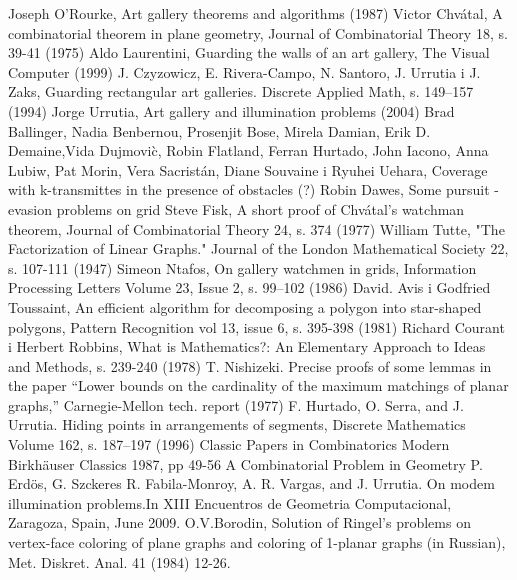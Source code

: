 \documentclass[brudnopis]{xmgr}
\theoremstyle{definition}
\begin{document}
\begin{bibdiv}
\begin{biblist}
  Joseph O'Rourke, Art gallery theorems and algorithms (1987)
  Victor Chv\'atal, A combinatorial theorem in plane geometry, Journal of Combinatorial Theory 18, s. 39-41 (1975)
  Aldo Laurentini, Guarding the walls of an art gallery, The Visual Computer (1999)
  J. Czyzowicz, E. Rivera-Campo, N. Santoro, J. Urrutia i J. Zaks, Guarding rectangular art galleries. Discrete Applied Math, s. 149–157 (1994)
  Jorge Urrutia, Art gallery and illumination problems (2004)
  Brad Ballinger, Nadia Benbernou, Prosenjit Bose, Mirela Damian, Erik D. Demaine,Vida Dujmovi\`c, Robin Flatland, Ferran Hurtado, John Iacono, Anna Lubiw, Pat Morin, Vera Sacristán, Diane Souvaine i Ryuhei Uehara, Coverage with k-transmittes in the presence of obstacles (?)
  Robin Dawes, Some pursuit - evasion problems on grid
  Steve Fisk, A short proof of Chv\'atal's watchman theorem, Journal of Combinatorial Theory 24, s. 374 (1977)
  William Tutte, "The Factorization of Linear Graphs." Journal of the London Mathematical Society 22, s. 107-111 (1947)
  Simeon Ntafos, On gallery watchmen in grids, Information Processing Letters Volume 23, Issue 2, s. 99–102 (1986)
  David. Avis i Godfried Toussaint, An efficient algorithm for decomposing a polygon into star-shaped polygons, Pattern Recognition vol 13, issue 6, s. 395-398 (1981)
  Richard Courant i Herbert Robbins, What is Mathematics?: An Elementary Approach to Ideas and Methods, s. 239-240 (1978)
  T. Nishizeki. Precise proofs of some lemmas in the paper “Lower bounds on the cardinality of the maximum matchings of planar graphs,” Carnegie-Mellon tech. report (1977)
   F. Hurtado, O. Serra, and J. Urrutia. Hiding points in arrangements of segments, Discrete Mathematics Volume 162, s. 187–197  (1996)
  Classic Papers in Combinatorics Modern Birkhäuser Classics 1987, pp 49-56 A Combinatorial Problem in Geometry P. Erdös, G. Szckeres
  R. Fabila-Monroy, A. R. Vargas, and J. Urrutia. On modem illumination problems.In XIII Encuentros de Geometria Computacional, Zaragoza, Spain, June 2009.
  O.V.Borodin, Solution of Ringel's problems on vertex-face coloring of plane graphs and coloring of 1-planar graphs (in Russian), Met. Diskret. Anal. 41 (1984) 12-26.
\end{biblist}
\end{bibdiv}

\listoffigures

\oswiadczenie
\end{document}
